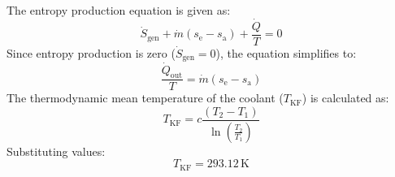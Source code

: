 The entropy production equation is given as:  
\[
\dot{S}_{\text{gen}} + \dot{m} (s_{\text{e}} - s_{\text{a}}) + \frac{\dot{Q}}{T} = 0
\]  
Since entropy production is zero (\( \dot{S}_{\text{gen}} = 0 \)), the equation simplifies to:  
\[
\frac{\dot{Q}_{\text{out}}}{T} = \dot{m} (s_{\text{e}} - s_{\text{a}})
\]  
The thermodynamic mean temperature of the coolant (\( T_{\text{KF}} \)) is calculated as:  
\[
T_{\text{KF}} = c \frac{(T_2 - T_1)}{\ln \left( \frac{T_2}{T_1} \right)}
\]  
Substituting values:  
\[
T_{\text{KF}} = 293.12 \, \text{K}
\]